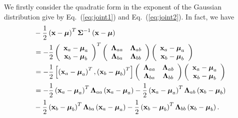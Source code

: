 \documentclass{article}
\begin{document}
	We firstly consider the quadratic form in the exponent of the Gaussian distribution give by Eq.~(\ref{eq:joint1}) and Eq.~(\ref{eq:joint2}). In fact, we have
   \begin{align}
   &-\frac{1}{2}\left(\mathbf{x} - \boldsymbol{\mu}\right)^{T}\boldsymbol{\Sigma}^{-1}\left(\mathbf{x}- \boldsymbol{\mu}\right)\notag\\
   &= -\frac{1}{2}\left(\begin{array}{c}
   \mathbf{x}_a - \boldsymbol{\mu}_a\\
   \mathbf{x}_b - \boldsymbol{\mu}_b
   \end{array}\right)^T
   \left(\begin{array}{cc}
   \mathbf{\Lambda}_{aa} & \mathbf{\Lambda}_{ab}\notag\\
   \mathbf{\Lambda}_{ba} & \mathbf{\Lambda}_{bb}\end{array}\right)
   \left(\begin{array}{c}
   \mathbf{x}_a - \boldsymbol{\mu}_a\\
   \mathbf{x}_b - \boldsymbol{\mu}_b\\\end{array}\right)\notag\\
   &= -\frac{1}{2}\left[\left(\mathbf{x}_a - \boldsymbol{\mu}_a\right)^T,\left(\mathbf{x}_b - \boldsymbol{\mu}_b\right)^T\right]
   \left(\begin{array}{cc}
   \mathbf{\Lambda}_{aa} & \mathbf{\Lambda}_{ab}\\
   \mathbf{\Lambda}_{ba} & \mathbf{\Lambda}_{bb}\end{array}\right)
   \left(\begin{array}{c}
   \mathbf{x}_a - \boldsymbol{\mu}_a\\
   \mathbf{x}_b - \boldsymbol{\mu}_b\\\end{array}\right)\notag\\
   & = -\frac{1}{2}\left(\mathbf{x}_a - \boldsymbol{\mu}_a\right)^T\boldsymbol{\Lambda}_{aa}\left(\mathbf{x}_a -\boldsymbol{\mu}_a\right)-\frac{1}{2}\left(\mathbf{x}_a - \boldsymbol{\mu}_a\right)^T\boldsymbol{\Lambda}_{ab}\left(\mathbf{x}_b -\boldsymbol{\mu}_b\right)\notag\\&-\frac{1}{2}\left(\mathbf{x}_b - \boldsymbol{\mu}_b\right)^T\boldsymbol{\Lambda}_{ba}\left(\mathbf{x}_a -\boldsymbol{\mu}_a\right)
   -\frac{1}{2}\left(\mathbf{x}_b - \boldsymbol{\mu}_b\right)^T\boldsymbol{\Lambda}_{bb}\left(\mathbf{x}_b -\boldsymbol{\mu}_b\right).\label{eq:joint3}
   \end{align}
\end{document}
